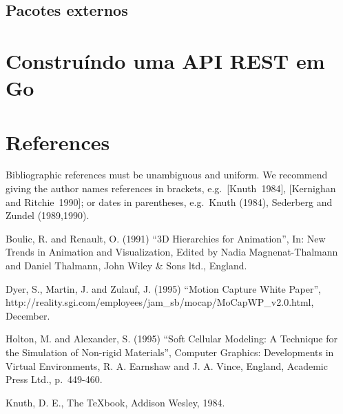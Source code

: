 \documentclass{SBCbookchapter}
\begin{document}
\subsection{Pacotes externos}

\section{Construíndo uma API REST em Go}


\section{References}
Bibliographic references must be unambiguous and uniform.  We
recommend giving the author names references in brackets,
e.g.~[Knuth~1984], [Kernighan and Ritchie~1990]; or dates in
parentheses, e.g.~Knuth (1984), Sederberg and Zundel (1989,1990).

\begin{thebibliography}{99}
	 Boulic, R. and Renault, O. (1991) ``3D Hierarchies for
	Animation'', In: New Trends in Animation and Visualization, Edited
	by Nadia Magnenat-Thalmann and Daniel Thalmann, John Wiley \& Sons
	ltd., England.
	
	 Dyer, S., Martin, J. and Zulauf, J. (1995) ``Motion
	Capture White Paper'',
	http://reality.sgi.com/employees/jam\_sb/mocap/MoCapWP\_v2.0.html,
	December.
	
	 Holton, M. and Alexander, S. (1995) ``Soft Cellular
	Modeling: A Technique for the Simulation of Non-rigid Materials'',
	Computer Graphics: Developments in Virtual Environments, R. A.
	Earnshaw and J. A. Vince, England, Academic Press Ltd., p.~449-460.
	
	 Knuth, D. E., The TeXbook, Addison Wesley, 1984.
\end{thebibliography}
	
\end{document}
